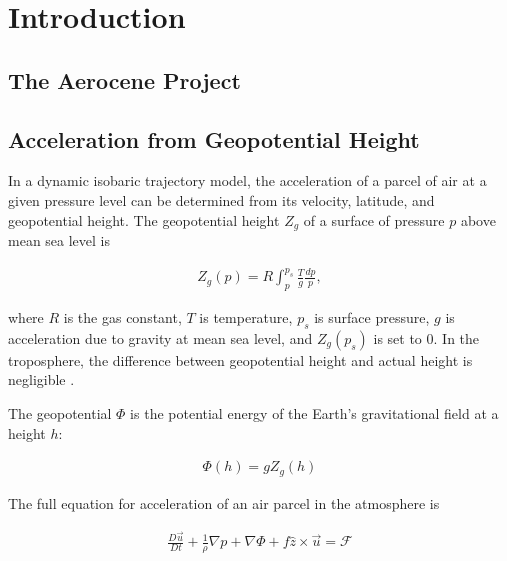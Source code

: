 \chapter{Introduction}

\section{The Aerocene Project}

\section{Acceleration from Geopotential Height} \label{sec:acceleration}
In a dynamic isobaric trajectory model, the acceleration of a parcel of air at a given pressure level can be determined from its velocity, latitude, and geopotential height.
The geopotential height $Z_g$ of a surface of pressure $p$ above mean sea level is 

\begin{align}
    Z_g(p) = R \int_p^{p_s} \frac{T}{g} \frac{dp}{p},
\end{align}

where $R$ is the gas constant, $T$ is temperature, $p_s$ is surface pressure, $g$ is acceleration due to gravity at mean sea level, and $Z_g(p_s)$ is set to 0. 
In the troposphere, the difference between geopotential height and actual height is negligible \cite{marshall_atmosphere_2008}. 

The geopotential $\Phi$ is the potential energy of the Earth's gravitational field at a height $h$:

\begin{align}
    \Phi (h) = g Z_g (h) \label{eq:geopotential}
\end{align}

The full equation for acceleration of an air parcel in the atmosphere is

\begin{align}
    \frac{D \vec{u}}{Dt} + \frac{1}{\rho} \nabla p + \nabla \Phi + f \hat{z} \times \vec{u} = \mathcal{F} \label{eq:full}
\end{align}

